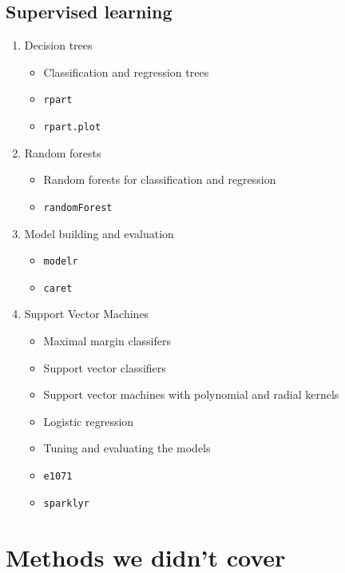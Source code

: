 \documentclass[]{book}
\providecommand{\tightlist}{%
  \setlength{\itemsep}{0pt}\setlength{\parskip}{0pt}}
\begin{document}
\hypertarget{supervised-learning}{%
\subsection{Supervised learning}\label{supervised-learning}}

\begin{enumerate}
\def\labelenumi{\arabic{enumi}.}
\setcounter{enumi}{2}
\tightlist
\item
  Decision trees

  \begin{itemize}
  \tightlist
  \item
    Classification and regression trees
  \item
    \texttt{rpart}
  \item
    \texttt{rpart.plot}
  \end{itemize}
\item
  Random forests

  \begin{itemize}
  \tightlist
  \item
    Random forests for classification and regression
  \item
    \texttt{randomForest}
  \end{itemize}
\item
  Model building and evaluation

  \begin{itemize}
  \tightlist
  \item
    \texttt{modelr}
  \item
    \texttt{caret}
  \end{itemize}
\item
  Support Vector Machines

  \begin{itemize}
  \tightlist
  \item
    Maximal margin classifers
  \item
    Support vector classifiers
  \item
    Support vector machines with polynomial and radial kernels
  \item
    Logistic regression
  \item
    Tuning and evaluating the models
  \item
    \texttt{e1071}
  \item
    \texttt{sparklyr}
  \end{itemize}
\end{enumerate}

\hypertarget{methods-we-didnt-cover}{%
\section{Methods we didn't cover}\label{methods-we-didnt-cover}}
\end{document}
